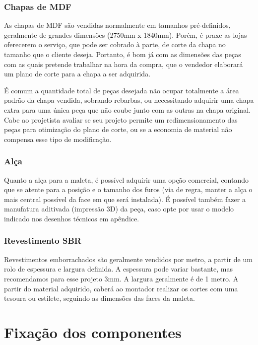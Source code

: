 \subsubsection{Chapas de MDF}
   As chapas de MDF são vendidas normalmente em tamanhos pré-definidos, geralmente de grandes dimensões (2750mm x 1840mm). Porém, é praxe as lojas oferecerem o serviço, que pode ser cobrado à parte, de corte da chapa no tamanho que o cliente deseja. Portanto, é bom já com as dimensões das peças com as quais pretende trabalhar na hora da compra, que o vendedor elaborará um plano de corte para a chapa a ser adquirida.
    \par É comum a quantidade total de peças desejada não ocupar totalmente a área padrão da chapa vendida, sobrando rebarbas, ou necessitando adquirir uma chapa extra para uma única peça que não coube junto com as outras na chapa original. Cabe ao projetista avaliar se seu projeto permite um redimensionamento das peças para otimização do plano de corte, ou se a economia de material não compensa esse tipo de modificação.

\subsubsection{Alça}
    \par Quanto a alça para a maleta, é possível adquirir uma opção comercial, contando que se atente para a posição e o tamanho dos furos (via de regra, manter a alça o mais central possível da face em que será instalada). É possível também fazer a manufatura aditivada (impressão 3D) da peça, caso opte por usar o modelo indicado nos desenhos técnicos em apêndice.

\subsubsection{Revestimento SBR}

Revestimentos emborrachados são geralmente vendidos por metro, a partir de um rolo de espessura e largura definida. A espessura pode variar bastante, mas recomendamos para esse projeto 3mm. A largura geralmente é de 1 metro. A partir do material adquirido, caberá ao montador realizar os cortes com uma tesoura ou estilete, seguindo as dimensões das faces da maleta. 


\section{Fixação dos componentes}

